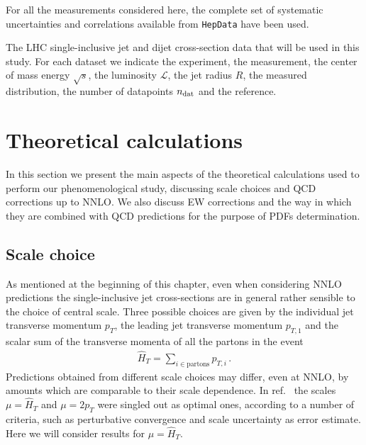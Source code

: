 %
For all the measurements considered here, the complete set of systematic uncertainties and correlations available from
{\tt HepData} have been used.

\begin{table}[!t]
    \centering
    \scriptsize
    \renewcommand{\arraystretch}{1.90}
    
    \vspace{0.3cm}
    \caption{\small The LHC single-inclusive jet and dijet cross-section data
       that will be used  in this study. For each dataset we indicate the experiment,
       the measurement, the center of mass energy $\sqrt{s}$, the luminosity 
       $\mathcal{L}$, the jet radius $R$, the measured distribution, the number of 
       datapoints $n_{\rm dat}$ and the reference.}
    \label{tab:input_datasets}
\end{table}
    


\section{Theoretical calculations}
\label{sec:jets_th}
In this section we present the main aspects of the theoretical calculations used to perform
our phenomenological study, discussing scale choices and QCD corrections up to NNLO.
We also discuss EW corrections and the way in which they are combined with QCD predictions for the 
purpose of PDFs determination.

\subsection{Scale choice}
As mentioned at the beginning of this chapter, even when considering NNLO predictions
the single-inclusive jet cross-sections are in general
rather sensible to the choice of central scale.
Three possible choices are given by the individual jet transverse momentum $p_T$, 
the leading jet transverse momentum $p_{T,1}$ and the scalar sum of the transverse momenta of all the partons
in the event 
\begin{align}
    \hat{H}_T = \sum_{i\in\text{partons}} p_{T,i}\,.
\end{align}
Predictions obtained from different scale choices may differ, even at NNLO, by amounts which are comparable to their
scale dependence.
In ref.~\cite{Currie:2018xkj} the scales $\mu = \hat{H}_T $ and $\mu = 2p_T$ were singled out as optimal ones,
according to a number of criteria, such as perturbative convergence and scale uncertainty as error estimate.
Here we will consider results for $\mu = \hat{H}_T$. 

